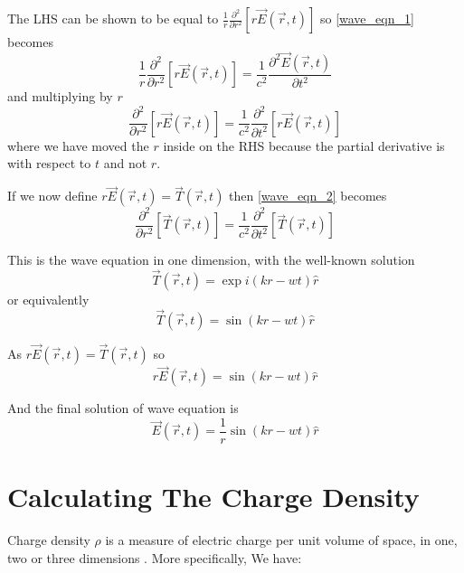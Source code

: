    The LHS can be shown to be equal to $\frac{1}{r}\frac{\partial^2}{\partial r^2}[r\vec{E}(\vec{r},t)]$ so \eqref{wave_eqn_1} becomes
%
   \begin{equation}
   \frac{1}{r}\frac{\partial^2}{\partial r^2}[r\vec{E}(\vec{r},t)] = \frac{1}{c^2}\frac{\partial^2\vec{E}(\vec{r},t)}{\partial t^2} 
   \end{equation}
%
and multiplying by $r$
%
   \begin{equation}\label{wave_eqn_2}
   \frac{\partial^2}{\partial r^2}[r\vec{E}(\vec{r},t)] = \frac{1}{c^2}\frac{\partial^2}{\partial t^2}[r\vec{E}(\vec{r},t)]
   \end{equation}
%
where we have moved the $r$ inside on the RHS because the partial derivative is with respect to $t$ and not $r$.

If we now define $r\vec{E}(\vec{r},t) = \vec{T}(\vec{r},t)$ then \eqref{wave_eqn_2} becomes
%
   \begin{equation}
   \frac{\partial^2}{\partial r^2}[\vec{T}(\vec{r},t)] = \frac{1}{c^2}\frac{\partial^2}{\partial t^2}[\vec{T}(\vec{r},t)]
   \end{equation}

This is the wave equation in one dimension, with the well-known solution
%
\begin{equation}
\vec{T}(\vec{r},t) = \exp{i(kr-wt)}\hat{r}
\end{equation}
%
or equivalently
%
\begin{equation}
   \vec{T}(\vec{r},t) = \sin(kr-wt) \hat{r}
\end{equation}

As $r \vec{E}(\vec{r},t) = \vec{T}(\vec{r},t)$ so
%
   \begin{equation}\label{eqn:radial_E}
      r\vec{E}(\vec{r},t) = \sin(kr-wt) \hat{r}
   \end{equation}

And the final solution of wave equation is
%
\begin{equation}\label{eqn_E_final}
   \vec{E}(\vec{r},t) = \frac{1}{r}\sin(kr-wt) \hat{r}
\end{equation}



\section{Calculating The Charge Density}

Charge density $\rho$ is a measure of electric charge per unit volume of space, in one, two or three dimensions \cite{wang1986electromagnetic}. More specifically, We have:


